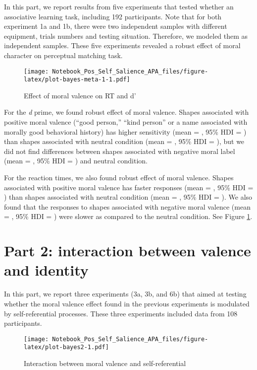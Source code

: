 \documentclass[
  english,
  man]{apa6}
\begin{document}
In this part, we report results from five experiments that tested whether an associative learning task, including 192 participants. Note that for both experiment 1a and 1b, there were two independent samples with different equipment, trials numbers and testing situation. Therefore, we modeled them as independent samples. These five experiments revealed a robust effect of moral character on perceptual matching task.

\begin{figure}
\centering
\texttt{[image: Notebook\_Pos\_Self\_Salience\_APA\_files/figure-latex/plot-bayes-meta-1-1.pdf]}
\caption{\label{fig:plot-bayes-meta-1}Effect of moral valence on RT and d'}
\end{figure}

For the \emph{d} prime, we found robust effect of moral valence. Shapes associated with positive moral valence (``good person,'' ``kind person'' or a name associated with morally good behavioral history) has higher sensitivity (mean = , 95\% HDI = ) than shapes associated with neutral condition (mean = , 95\% HDI = ), but we did not find differences between shapes associated with negative moral label (mean = , 95\% HDI = ) and neutral condition.

For the reaction times, we also found robust effect of moral valence. Shapes associated with positive moral valence has faster responses (mean = , 95\% HDI = ) than shapes associated with neutral condition (mean = , 95\% HDI = ). We also found that the responses to shapes associated with negative moral valence (mean = , 95\% HDI = ) were slower as compared to the neutral condition. See Figure \ref{fig:plot-bayes-meta-1}.

\hypertarget{part-2-interaction-between-valence-and-identity}{%
\section{Part 2: interaction between valence and identity}\label{part-2-interaction-between-valence-and-identity}}

In this part, we report three experiments (3a, 3b, and 6b) that aimed at testing whether the moral valence effect found in the previous experiments is modulated by self-referential processes. These three experiments included data from 108 participants.

\begin{figure}
\centering
\texttt{[image: Notebook\_Pos\_Self\_Salience\_APA\_files/figure-latex/plot-bayes2-1.pdf]}
\caption{\label{fig:plot-bayes2}Interaction between moral valence and self-referential}
\end{figure}
\end{document}
